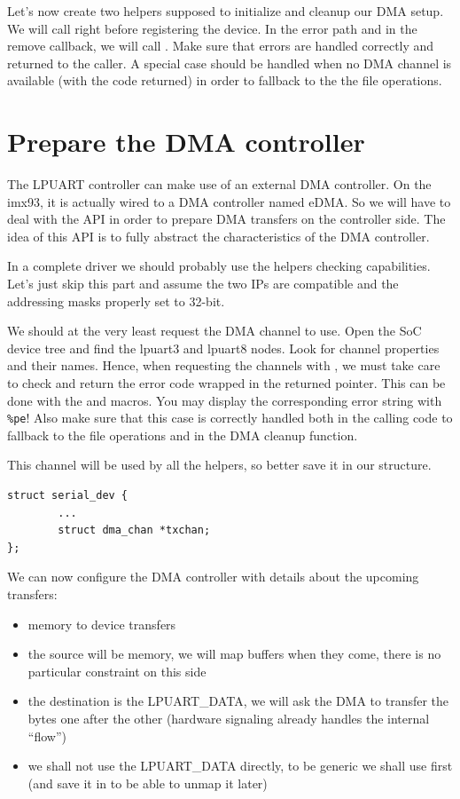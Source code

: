 Let's now create two helpers supposed to initialize and cleanup our DMA
setup. We will call  right before registering
the  device. In the  error path and in the
remove callback, we will call . Make sure that errors
are handled correctly and returned to the caller. A special case should be
handled when no DMA channel is available (with the  code returned)
in order to fallback to the the  file operations.

\section{Prepare the DMA controller}

The LPUART controller can make use of an external DMA controller. On
the imx93, it is actually wired to a DMA controller named eDMA. So we
will have to deal with the  API in order to prepare DMA
transfers on the controller side. The idea of this API is to fully
abstract the characteristics of the DMA controller.

In a complete driver we should probably use the helpers checking
capabilities. Let's just skip this part and assume the two IPs are
compatible and the addressing masks properly set to 32-bit.

We should at the very least request the DMA channel to use. Open the SoC
device tree and find the lpuart3 and lpuart8 nodes. Look for 
channel properties and their names. Hence, when requesting the channels with
, we must take care to check and return the error code
wrapped in the returned  pointer. This can be done with the
 and  macros. You may display the corresponding
error string with {\tt \%pe}! Also make sure that this case is correctly handled
both in the calling code to fallback to the  file
operations and in the DMA cleanup function.

This channel will be used by all the  helpers, so better
save it in our  structure.
\begin{verbatim}
struct serial_dev {
        ...
        struct dma_chan *txchan;
};
\end{verbatim}

We can now configure the DMA controller with details about the upcoming
transfers:
\begin{itemize}
\item memory to device transfers
\item the source will be memory, we will map buffers when they come,
  there is no particular constraint on this side
\item the destination is the LPUART\_DATA, we will ask the DMA to
  transfer the bytes one after the other (hardware signaling already
  handles the internal ``flow'')
\item we shall not use the LPUART\_DATA directly, to be generic we shall use
   first (and save it in  to be able
  to unmap it later)
\end{itemize}

